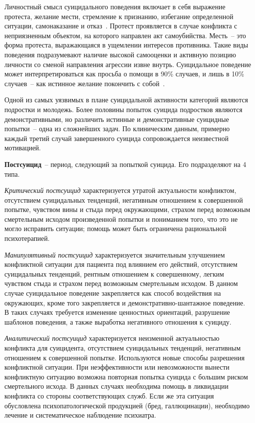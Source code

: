 Личностный смысл суицидального поведения включает в себя выражение протеста, желание мести, стремление к признанию, избегание определенной ситуации, самонаказание и отказ~\cite{starsen}. 
Протест проявляется в случае конфликта с неприязненным объектом, на которого направлен акт самоубийства. 
Месть~-- это форма протеста, выражающаяся в ущемлении интересов противника. Такие виды поведения подразумевают наличие высокой самооценки и активную позицию личности со сменой направления агрессии извне внутрь.
Суицидальное поведение может интерпретироваться как просьба о помощи в 90\% случаев, и лишь в 10\% случаев~-- как истинное желание покончить с собой~\cite{Kasyanov}.

Одной из самых уязвимых в плане суицидальной активности категорий являются подростки и молодежь. 
Более половины попыток суицида подростков являются демонстративными, но различить истинные и демонстративные суицидные попытки~-- одна из сложнейших задач. 
По клиническим данным, примерно каждый третий случай завершенного суицида сопровождается неизвестной мотивацией.~\cite{suicidalContent}

\textbf{Постсуицид}~-- период, следующий за попыткой суицида. Его подразделяют на 4 типа.~\cite{starsen}

\textit{Критический постсуицид} характеризуется утратой актуальности конфликтом, отсутствием суицидальных тенденций, негативным отношением к совершенной попытке, чувством вины и стыда перед окружающими, страхом перед возможным смертельным исходом произведенной попытки и пониманием того, что это не могло исправить ситуации; помощь может быть ограничена рациональной психотерапией.~\cite{starsen}

\textit{Манипулятивный постсуицид} характеризуется значительным улучшением конфликтной ситуации для пациента под влиянием его действий, отсутствием суицидальных тенденций, рентным отношением к совершенному, легким чувством стыда и страхом перед возможным смертельным исходом. 
В данном случае суицидальное поведение закрепляется как способ воздействия на окружающих, кроме того закрепляется и демонстративно-шантажное поведение. В таких случаях требуется изменение ценностных ориентаций, разрушение шаблонов поведения, а также выработка негативного отношения к суициду.~\cite{starsen}

\textit{Аналитический постсуицид} характеризуется неизменной актуальностью конфликта для суицидента, отсутствием суицидальных тенденций, негативным отношением к совершенной попытке.
Используются новые способы разрешения конфликтной ситуации. 
При неэффективности или невозможности вынести конфликтную ситуацию возможна повторная попытка суицида с большим риском смертельного исхода. 
В данных случаях необходима помощь в ликвидации конфликта со стороны соответствующих служб. 
Если же эта ситуация обусловлена психопатологической продукцией (бред, галлюцинации), необходимо лечение и систематическое наблюдение психиатра.~\cite{starsen}

